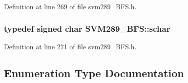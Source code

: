 Definition at line 269 of file svm289\+\_\+\+B\+F\+S.\+h.

\subsubsection[{\texorpdfstring{schar}{schar}}]{\setlength{\rightskip}{0pt plus 5cm}typedef signed char {\bf S\+V\+M289\+\_\+\+B\+F\+S\+::schar}}\hypertarget{namespace_s_v_m289___b_f_s_a67b51ac46a91cdb7ad72dea9fad6c0f0}{}\label{namespace_s_v_m289___b_f_s_a67b51ac46a91cdb7ad72dea9fad6c0f0}


Definition at line 271 of file svm289\+\_\+\+B\+F\+S.\+h.



\subsection{Enumeration Type Documentation}
